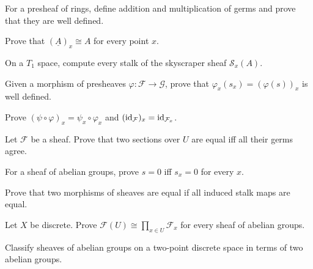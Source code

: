 \begin{exercise}
For a presheaf of rings, define addition and multiplication of germs and prove that they are well defined.
\end{exercise}

\begin{exercise}
Prove that $(\underline A)_x\cong A$ for every point $x$.
\end{exercise}

\begin{exercise}
On a $T_1$ space, compute every stalk of the skyscraper sheaf $\mathcal S_x(A)$.
\end{exercise}

\begin{exercise}
Given a morphism of presheaves $\varphi:\mathcal F\to\mathcal G$, prove that $\varphi_x(s_x)=(\varphi(s))_x$ is well defined.
\end{exercise}

\begin{exercise}[Functoriality]
Prove $(\psi\circ\varphi)_x=\psi_x\circ\varphi_x$ and $(\operatorname{id}_\mathcal F)_x=\operatorname{id}_{\mathcal F_x}$.
\end{exercise}

\begin{exercise}
Let $\mathcal F$ be a sheaf. Prove that two sections over $U$ are equal iff all their germs agree.
\end{exercise}

\begin{exercise}
For a sheaf of abelian groups, prove $s=0$ iff $s_x=0$ for every $x$.
\end{exercise}

\begin{exercise}
Prove that two morphisms of sheaves are equal if all induced stalk maps are equal.
\end{exercise}

\begin{exercise}
Let $X$ be discrete. Prove $\mathcal F(U)\cong\prod_{x\in U}\mathcal F_x$ for every sheaf of abelian groups.
\end{exercise}

\begin{exercise}
Classify sheaves of abelian groups on a two-point discrete space in terms of two abelian groups.
\end{exercise}

